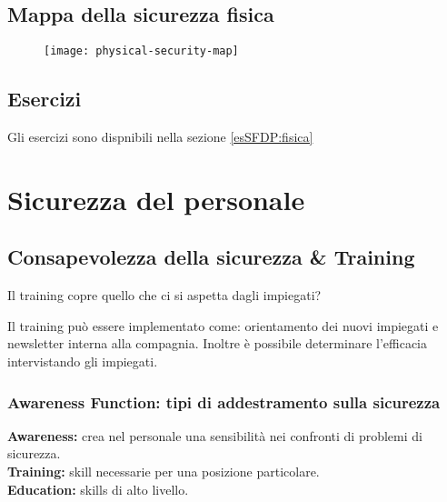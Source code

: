 \subsection{Mappa della sicurezza fisica}
\begin{figure}[H]
 \centering
 \texttt{[image: physical-security-map]}
\end{figure}

\subsection{Esercizi}

Gli esercizi sono dispnibili nella sezione \ref{esSFDP:fisica}

\section{Sicurezza del personale}

\subsection{Consapevolezza della sicurezza \& Training}

Il training copre quello che ci si aspetta dagli impiegati?

Il training può essere implementato come: orientamento dei nuovi impiegati e 
newsletter interna alla compagnia. Inoltre è possibile determinare l'efficacia 
intervistando gli impiegati.


\subsubsection{Awareness Function: tipi di addestramento sulla sicurezza}

\textbf{Awareness:} crea nel personale una sensibilità nei confronti di problemi di 
sicurezza.\\
\newline
\textbf{Training:} skill necessarie per una posizione particolare.\\
\newline
\textbf{Education:} skills di alto livello.\\
